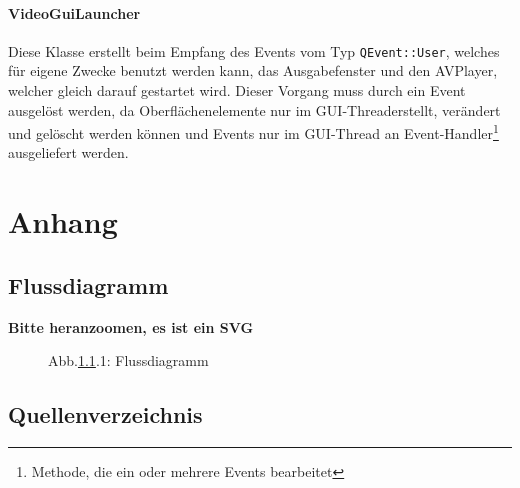 \documentclass{article}
\begin{document}
    \paragraph{VideoGuiLauncher}
    Diese Klasse erstellt beim Empfang des Events vom Typ \texttt{QEvent::User}, welches für eigene Zwecke benutzt werden kann, das Ausgabefenster und den AVPlayer,
    welcher gleich darauf gestartet wird.
    Dieser Vorgang muss durch ein Event ausgelöst werden, da Oberflächenelemente nur im GUI-Thread\footnotemark[1] erstellt, verändert und gelöscht werden können und
    Events nur im GUI-Thread an Event-Handler\footnote[2]{Methode, die ein oder mehrere Events bearbeitet} ausgeliefert werden.

    \newpage


    \section{Anhang}

    \subsection{Flussdiagramm}\label{subsec:flussdiagramm}
    \textbf{Bitte heranzoomen, es ist ein SVG}
    \begin{figure}[!ht]
        \centering
        \def\svgwidth{\textwidth}
        
        \caption*{Abb.\ref{subsec:flussdiagramm}.1: Flussdiagramm}
        \label{fig:figureFlowChart}
    \end{figure}

    \newpage

    \subsection{Quellenverzeichnis}
\end{document}
